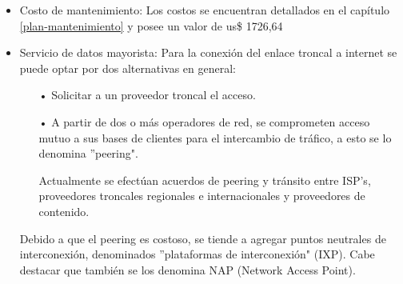 \begin{itemize}
\item Costo de mantenimiento: Los costos se encuentran detallados en el capítulo \ref{plan-mantenimiento} y posee un valor de us\$ 1726,64


\item Servicio de datos mayorista:
Para la conexión del enlace troncal a internet se puede optar por dos alternativas
en general:
\begin{enumerate}
\item[•]Solicitar a un proveedor troncal el acceso.
\item[•]A partir de dos o más operadores de red, se comprometen acceso mutuo a sus
bases de clientes para el intercambio de tráfico, a esto se lo denomina ''peering".

Actualmente se efectúan acuerdos de peering y tránsito entre ISP's, proveedores
troncales regionales e internacionales y proveedores de contenido.
\end{enumerate}




Debido a que el peering es costoso, se tiende a agregar puntos
neutrales de interconexión, denominados ''plataformas de interconexión" (IXP).
Cabe destacar que también se los denomina NAP (Network Access Point).


\end{itemize}

